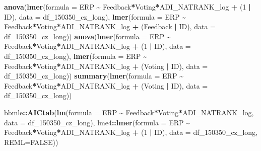 \documentclass[
]{article}
\newenvironment{Shaded}{\begin{snugshade}}{\end{snugshade}}
\newcommand{\AttributeTok}[1]{\textcolor[rgb]{0.13,0.29,0.53}{#1}}
\newcommand{\ConstantTok}[1]{\textcolor[rgb]{0.56,0.35,0.01}{#1}}
\newcommand{\DecValTok}[1]{\textcolor[rgb]{0.00,0.00,0.81}{#1}}
\newcommand{\FunctionTok}[1]{\textcolor[rgb]{0.13,0.29,0.53}{\textbf{#1}}}
\newcommand{\NormalTok}[1]{#1}
\newcommand{\SpecialCharTok}[1]{\textcolor[rgb]{0.81,0.36,0.00}{\textbf{#1}}}
\begin{document}
\begin{Shaded}
\begin{Highlighting}[]
\FunctionTok{anova}\NormalTok{(}\FunctionTok{lmer}\NormalTok{(}\AttributeTok{formula =}\NormalTok{ ERP }\SpecialCharTok{\textasciitilde{}}\NormalTok{ Feedback}\SpecialCharTok{*}\NormalTok{Voting}\SpecialCharTok{*}\NormalTok{ADI\_NATRANK\_log }\SpecialCharTok{+}\NormalTok{ (}\DecValTok{1} \SpecialCharTok{|}\NormalTok{ ID), }\AttributeTok{data =}\NormalTok{ df\_150350\_cz\_long),}
      \FunctionTok{lmer}\NormalTok{(}\AttributeTok{formula =}\NormalTok{ ERP }\SpecialCharTok{\textasciitilde{}}\NormalTok{ Feedback}\SpecialCharTok{*}\NormalTok{Voting}\SpecialCharTok{*}\NormalTok{ADI\_NATRANK\_log }\SpecialCharTok{+}\NormalTok{ (Feedback }\SpecialCharTok{|}\NormalTok{ ID), }\AttributeTok{data =}\NormalTok{ df\_150350\_cz\_long))}
\FunctionTok{anova}\NormalTok{(}\FunctionTok{lmer}\NormalTok{(}\AttributeTok{formula =}\NormalTok{ ERP }\SpecialCharTok{\textasciitilde{}}\NormalTok{ Feedback}\SpecialCharTok{*}\NormalTok{Voting}\SpecialCharTok{*}\NormalTok{ADI\_NATRANK\_log }\SpecialCharTok{+}\NormalTok{ (}\DecValTok{1} \SpecialCharTok{|}\NormalTok{ ID), }\AttributeTok{data =}\NormalTok{ df\_150350\_cz\_long),}
      \FunctionTok{lmer}\NormalTok{(}\AttributeTok{formula =}\NormalTok{ ERP }\SpecialCharTok{\textasciitilde{}}\NormalTok{ Feedback}\SpecialCharTok{*}\NormalTok{Voting}\SpecialCharTok{*}\NormalTok{ADI\_NATRANK\_log }\SpecialCharTok{+}\NormalTok{ (Voting }\SpecialCharTok{|}\NormalTok{ ID), }\AttributeTok{data =}\NormalTok{ df\_150350\_cz\_long))}
\FunctionTok{summary}\NormalTok{(}\FunctionTok{lmer}\NormalTok{(}\AttributeTok{formula =}\NormalTok{ ERP }\SpecialCharTok{\textasciitilde{}}\NormalTok{ Feedback}\SpecialCharTok{*}\NormalTok{Voting}\SpecialCharTok{*}\NormalTok{ADI\_NATRANK\_log }\SpecialCharTok{+}\NormalTok{ (Voting }\SpecialCharTok{|}\NormalTok{ ID), }\AttributeTok{data =}\NormalTok{ df\_150350\_cz\_long))}

\NormalTok{bbmle}\SpecialCharTok{::}\FunctionTok{AICtab}\NormalTok{(}\FunctionTok{lm}\NormalTok{(}\AttributeTok{formula =}\NormalTok{ ERP }\SpecialCharTok{\textasciitilde{}}\NormalTok{ Feedback}\SpecialCharTok{*}\NormalTok{Voting}\SpecialCharTok{*}\NormalTok{ADI\_NATRANK\_log, }\AttributeTok{data =}\NormalTok{ df\_150350\_cz\_long),}
\NormalTok{      lme4}\SpecialCharTok{::}\FunctionTok{lmer}\NormalTok{(}\AttributeTok{formula =}\NormalTok{ ERP }\SpecialCharTok{\textasciitilde{}}\NormalTok{ Feedback}\SpecialCharTok{*}\NormalTok{Voting}\SpecialCharTok{*}\NormalTok{ADI\_NATRANK\_log }\SpecialCharTok{+}\NormalTok{ (}\DecValTok{1} \SpecialCharTok{|}\NormalTok{ ID), }\AttributeTok{data =}\NormalTok{ df\_150350\_cz\_long, }\AttributeTok{REML=}\ConstantTok{FALSE}\NormalTok{))}


\end{Highlighting}
\end{Shaded}
\end{document}
